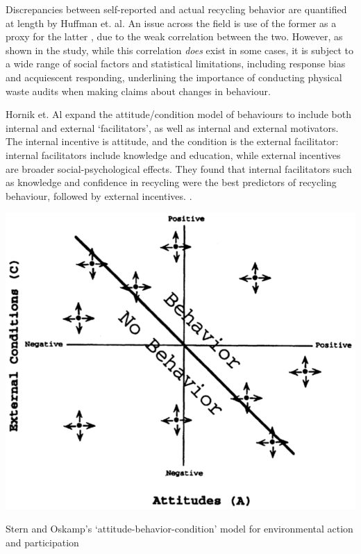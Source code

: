 \documentclass[nofonts,nols,justified,nobib]{tufte-book}
\begin{document}
Discrepancies between self-reported and actual recycling behavior are quantified at length by Huffman et. al. An issue across the field is use of the former as a proxy for the latter \cite{varotto_psychological_2017, huffman_when_2014}, due to the weak correlation between the two. However, as shown in the study, while this correlation \emph{does} exist in some cases, it is subject to a wide range of social factors and statistical limitations, including response bias and acquiescent responding, underlining the importance of conducting physical waste audits when making claims about changes in behaviour.

Hornik et. Al expand the attitude/condition model of behaviours to include both internal and external `facilitators', as well as internal and external motivators. The internal incentive is attitude, and the condition is the external facilitator: internal facilitators include knowledge and education, while external incentives are broader social-psychological effects. They found that internal facilitators such as knowledge and confidence in recycling were the best predictors of recycling behaviour, followed by external incentives. \cite{hornik_determinants_1995}. 

\begin{marginfigure}
\includegraphics[width=\textwidth]{img/1/attitude-condition.png}
\caption{Stern and Oskamp's `attitude-behavior-condition' model for environmental action and participation \cite{stern_managing_1987}}
\end{marginfigure}
\end{document}
